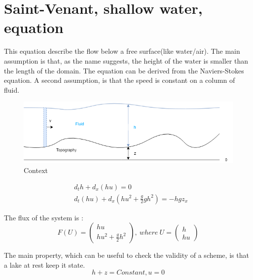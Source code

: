 \clearpage
\newpage
\section{Saint-Venant, shallow water, equation}
    This equation describe the flow below a free surface(like water/air). The main assumption is that, as the name suggests, the height of the water is smaller than the length of the domain. The equation can be derived from the Naviers-Stokes equation. A second assumption, is that the speed is constant on a column of fluid.
    
    \begin{figure}[H]
        \centering
        \includegraphics[width=14cm]{modele.png}
        \caption{Context}
        \label{fig:my_domain}
    \end{figure}
    
    \begin{align*}
        &d_t h + d_x(hu) = 0 \\
        &d_t(hu) + d_x\left( hu^2+ \frac{g}{2}gh^2 \right) = - hgz_x
    \end{align*}
    
    The flux of the system is :
    \begin{equation*}
        F(U) = \begin{pmatrix} hu \\ hu^2 + \frac{g}{2}h^2 \end{pmatrix},~where~U=\begin{pmatrix} h \\ hu \end{pmatrix}
    \end{equation*}
    
    
    The main property, which can be useful to check the validity of a scheme, is that a lake at rest keep it state.
    \begin{equation*}
        h + z = Constant, u = 0
    \end{equation*}
            
            
            
            
            
